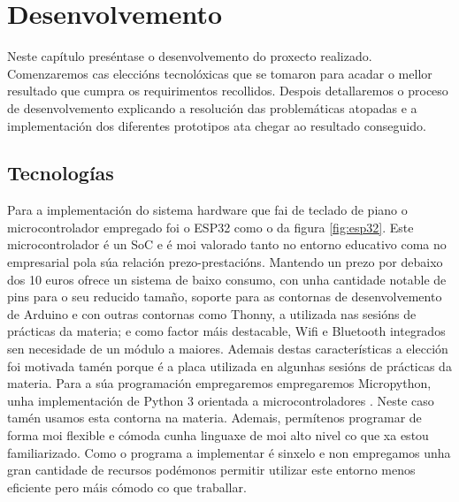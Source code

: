\chapter{Desenvolvemento}
\label{cap:desarrollo}

Neste capítulo preséntase o desenvolvemento do proxecto realizado. Comenzaremos cas eleccións tecnolóxicas que se tomaron para acadar o mellor resultado que cumpra os requirimentos recollidos. Despois detallaremos o proceso de desenvolvemento explicando a resolución das problemáticas atopadas e a implementación dos diferentes prototipos ata chegar ao resultado conseguido.  

\section{Tecnologías}
Para a implementación do sistema hardware que fai de teclado de piano o microcontrolador empregado foi o ESP32 como o da figura \ref{fig:esp32}. Este microcontrolador é un SoC e é moi valorado tanto no entorno educativo coma no empresarial pola súa relación prezo-prestacións. Mantendo un prezo por debaixo dos 10 euros ofrece un sistema de baixo consumo, con unha cantidade notable de pins para o seu reducido tamaño, soporte para as contornas de desenvolvemento de Arduino e con outras contornas como Thonny, a utilizada nas sesións de prácticas da materia; e como factor máis destacable, Wifi e Bluetooth integrados sen necesidade de un módulo a maiores\cite{ESP32MX}. Ademais destas características a elección foi motivada tamén porque é a placa utilizada en algunhas sesións de prácticas da materia.
Para a súa programación empregaremos empregaremos Micropython, unha implementación de Python 3 orientada a microcontroladores \cite{MicroPython}. Neste caso tamén usamos esta contorna na materia. Ademais, permítenos programar de forma moi flexible e cómoda cunha linguaxe de moi alto nivel co que xa estou familiarizado. Como o programa a implementar é sinxelo e non empregamos unha gran cantidade de recursos podémonos permitir utilizar este entorno menos eficiente pero máis cómodo co que traballar.


